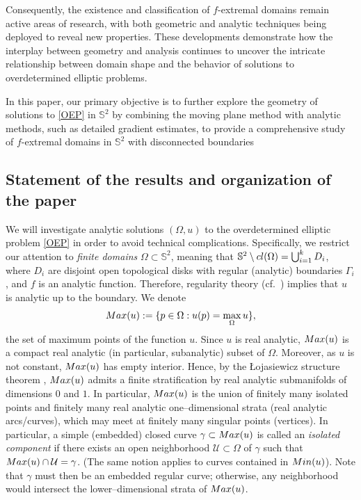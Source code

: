 \documentclass[11pt]{article}
\newcommand{\Max}{\textup{Max}}
\newcommand{\U}{\mathcal{U}}
\numberwithin{equation} {section}
\begin{document}
Consequently, the existence and classification of \(f\)-extremal domains remain active areas of research, with both geometric and analytic techniques being deployed to reveal new properties. These developments demonstrate how the interplay between geometry and analysis continues to uncover the intricate relationship between domain shape and the behavior of solutions to overdetermined elliptic problems. 

In this paper, our primary objective is to further explore the geometry of solutions to \eqref{OEP} in \(\mathbb{S}^2\) by combining the moving plane method with analytic methods, such as detailed gradient estimates, to provide a comprehensive study of $f$-extremal domains in \(\mathbb{S}^2\) with disconnected boundaries

\subsection{Statement of the results and organization of the paper}

We will investigate analytic solutions \((\Omega, u)\) to the overdetermined elliptic problem \eqref{OEP} in order to avoid technical complications. Specifically, we restrict our attention to \textit{finite domains} \(\Omega \subset \mathbb{S}^2\), meaning that \(\mathbb{S}^2 \setminus {\rm cl}(\Omega) = \bigcup_{i=1}^k D_i\), where \(D_i\) are disjoint open topological disks with regular (analytic) boundaries \(\Gamma_i\), and \(f \) is an analytic function. Therefore, regularity theory (cf.~\cite{GT}) implies that $u$ is analytic up to the boundary. We denote 
\[
\Max(u) := \{ p \in \Omega : u(p) = \max_{\Omega} u \},
\]
the set of maximum points of the function \(u\). Since \(u\) is real analytic, \(\Max(u)\) is a compact
real analytic (in particular, subanalytic) subset of \(\Omega\). Moreover, as \(u\) is not constant,
\(\Max(u)\) has empty interior. Hence, by the \L{}ojasiewicz structure theorem \cite{Kr}, \(\Max(u)\) admits
a finite stratification by real analytic submanifolds of dimensions \(0\) and \(1\). In particular,
\(\Max(u)\) is the union of finitely many isolated points and finitely many real analytic
one--dimensional strata (real analytic arcs/curves), which may meet at finitely many singular
points (vertices). In particular, a simple (embedded) closed curve $\gamma\subset \Max(u)$ is called an \emph{isolated component} if there exists an open neighborhood $\U\subset \Omega$ of $\gamma$ such that $\Max(u)\cap \U=\gamma$. (The same notion applies to curves contained in ${\rm Min}(u)$). Note that $\gamma$ must then be an embedded regular curve; otherwise, any neighborhood would intersect the lower--dimensional strata of $\textup{Max}(u)$.
\end{document}
